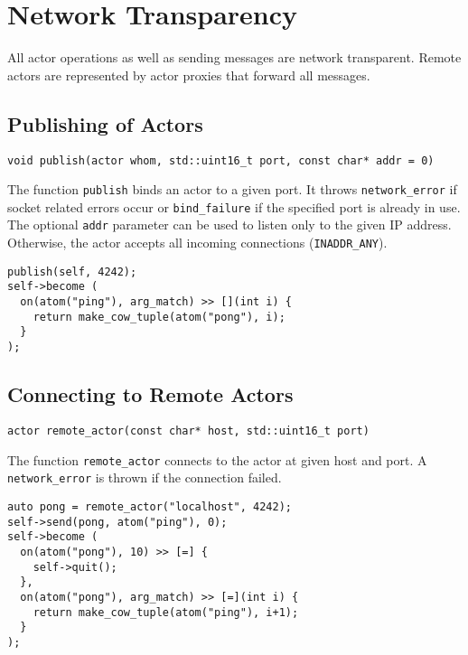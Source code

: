 \section{Network Transparency}

All actor operations as well as sending messages are network transparent.
Remote actors are represented by actor proxies that forward all messages.

\subsection{Publishing of Actors}

\begin{lstlisting}
void publish(actor whom, std::uint16_t port, const char* addr = 0)
\end{lstlisting}

The function \lstinline^publish^ binds an actor to a given port.
It throws \lstinline^network_error^ if socket related errors occur or \lstinline^bind_failure^ if the specified port is already in use.
The optional \lstinline^addr^ parameter can be used to listen only to the given IP address.
Otherwise, the actor accepts all incoming connections (\lstinline^INADDR_ANY^).

\begin{lstlisting}
publish(self, 4242);
self->become (
  on(atom("ping"), arg_match) >> [](int i) {
    return make_cow_tuple(atom("pong"), i);
  }
);
\end{lstlisting}

\subsection{Connecting to Remote Actors}

\begin{lstlisting}
actor remote_actor(const char* host, std::uint16_t port)
\end{lstlisting}

The function \lstinline^remote_actor^ connects to the actor at given host and port.
A \lstinline^network_error^ is thrown if the connection failed.

\begin{lstlisting}
auto pong = remote_actor("localhost", 4242);
self->send(pong, atom("ping"), 0);
self->become (
  on(atom("pong"), 10) >> [=] {
    self->quit();
  },
  on(atom("pong"), arg_match) >> [=](int i) {
    return make_cow_tuple(atom("ping"), i+1);
  }
);
\end{lstlisting}
